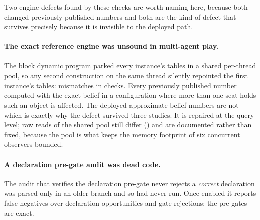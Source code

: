 Two engine defects found by these checks are worth naming here, because both changed previously
published numbers and both are the kind of defect that survives precisely because it is invisible to
the deployed path.

\paragraph{The exact reference engine was unsound in multi-agent play.} The block dynamic program
parked every instance's tables in a shared per-thread pool, so any second construction on the same
thread silently repointed the first instance's tables: \numAliasMismatch{} mismatches in
\numAliasChecks{} checks. Every previously published number computed with the exact belief in a
configuration where more than one seat holds such an object is affected. The deployed
approximate-belief numbers are not --- which is exactly why the defect survived three studies. It is
repaired at the query level; raw reads of the shared pool still differ (\vsixAliasRawMismatch{}) and
are documented rather than fixed, because the pool is what keeps the memory footprint of six
concurrent observers bounded.

\paragraph{A declaration pre-gate audit was dead code.} The audit that verifies the declaration
pre-gate never rejects a \emph{correct} declaration was parsed only in an older branch and so had
never run. Once enabled it reports \vsixGateFalseNeg{} false negatives over
\vsixGateOpportunities{} declaration opportunities and \vsixGateRejected{} gate rejections: the
pre-gates are exact.
